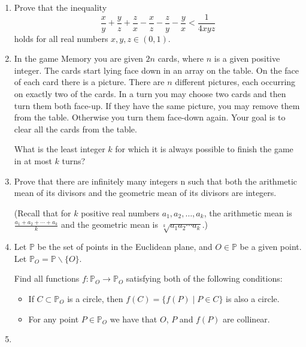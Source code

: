 \documentclass{article}
\begin{document}
\begin{enumerate}[1.]

\vspace{6pt}
\item %
Prove that the inequality
\[ \frac{x}{y} +\frac{y}{z} +\frac{z}{x} -\frac{x}{z} -\frac{z}{y} -\frac{y}{x} < \frac{1}{4xyz} \]
holds for all real numbers $x,y,z \in (0,1)$.


\vspace{6pt}
\item %
In the game Memory you are given $2n$ cards, where $n$ is a given positive integer. The cards start lying face down in an array on the table. On the face of each card there is a picture. There are $n$ different pictures, each occurring on exactly two of the cards. In a turn you may choose two cards and then turn them both face-up. If they have the same picture, you may remove them from the table. Otherwise you turn them face-down again. Your goal is to clear all the cards from the table.

What is the least integer $k$ for which it is always possible to finish the game in at most $k$ turns?


\vspace{6pt}
\item %
Prove that there are infinitely many integers n such that both the arithmetic mean of its divisors and the geometric mean of its divisors are integers.

(Recall that for $k$ positive real numbers $a_1, a_2, \dotsc, a_k$, the arithmetic mean is $\frac{a_1 +a_2 +\dotsb +a_k}{k}$ and the geometric mean is $\sqrt[k]{a_1 a_2 \dotsm a_k}$.)


\vspace{6pt}
\item %
Let $\mathbb{P}$ be the set of points in the Euclidean plane, and $O \in \mathbb{P}$ be a given point. Let $\mathbb{P}_O = \mathbb{P} \backslash \{O\}$.

Find all functions $f : \mathbb{P}_O \to \mathbb{P}_O$ satisfying both of the following conditions:
\begin{itemize}
  \item If $C \subset \mathbb{P}_O$ is a circle, then $f(C) = \{ f(P) \mid P \in C \}$ is also a circle.
  \item For any point $P \in \mathbb{P}_O$ we have that $O$, $P$ and $f(P)$ are collinear.
\end{itemize}


\vspace{6pt}
\item



\end{enumerate}
\end{document}
